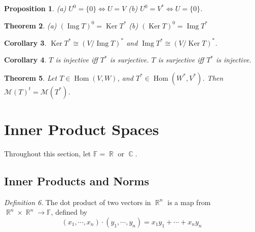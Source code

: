 \documentclass[12pt]{amsart}
\newcommand{\fff}[0]{\mathbb{F}}
\renewcommand{\ker}{\Ker}
\DeclareMathOperator{\Ker}{Ker}
\DeclareMathOperator{\rr}{\mathbb{R}}
\DeclareMathOperator{\cc}{\mathbb{C}}
\DeclareMathOperator{\Hom}{Hom}
\DeclareMathOperator{\img}{Img}
\newcommand{\calM}[0]{\mathcal{M}}
\newtheorem{theorem}{Theorem}[section]
\newtheorem{proposition}[theorem]{Proposition}
\newtheorem{corollary}[theorem]{Corollary}
\theoremstyle{remark}
\newtheorem{definition}[theorem]{Definition}
\numberwithin{equation}{section}
\begin{document}
	\begin{proposition}
		\textup{(a)} $U^0=\{0\}\iff U=V$ \textup{(b)} $U^0=V^*\iff U=\{0\}$.
	\end{proposition}
	\begin{theorem}
		\textup{(a)} $(\img T)^0=\ker T^*$ \textup{(b)} $(\ker T)^0=\img T^*$
	\end{theorem}
	\begin{corollary}
		$\ker T^*\cong (V/\img T)^*$ and $\img T^* \cong (V/\ker T)^*$.
	\end{corollary}
	\begin{corollary}
		$T$ is injective iff $T^*$ is surjective. $T$ is surjective iff $T^*$ is injective.
	\end{corollary}
	\begin{theorem}
		Let $T\in \Hom(V,W)$, and $T^*\in\Hom(W^*,V^*)$. Then $\calM(T)^t=\calM(T^*)$.
	\end{theorem}
	\section{Inner Product Spaces}Throughout this section, let $\fff=\rr$ or $\cc$.
	\subsection{Inner Products and Norms}
	\begin{definition}
		The dot product of two vectors in $\rr^n$ is a map from $\rr^n\times \rr^n\to \fff$, defined by
		\[(x_1,\cdots,x_n)\cdot (y_1,\cdots,y_n)=x_1y_1+\cdots+x_ny_n\]
	\end{definition}
	
	
\end{document}
